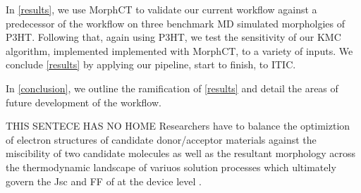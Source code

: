 In \autoref{results}, we use MorphCT to validate our current workflow against a predecessor of the 
workflow on three benchmark MD simulated morpholgies of P3HT. 
Following that, again using P3HT, we test the sensitivity of our KMC algorithm, implemented
implemented with MorphCT, to a variety of inputs. We conclude \autoref{results} by applying our pipeline,
start to finish, to ITIC. 

In \autoref{conclusion}, we outline the ramification of \autoref{results} and detail the areas of future
development of the workflow. 

THIS SENTECE HAS NO HOME Researchers have to
balance the optimiztion of electron structures of candidate donor/acceptor materials against the miscibility
of two candidate molecules as well as the resultant morphology across the thermodynamic landscape of
variuos solution processes which ultimately govern the Jsc and FF of at the device level \cite{Zhu2020a}. 
